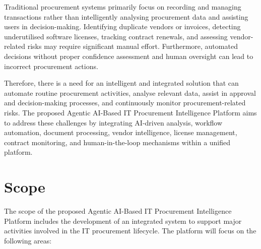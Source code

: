 Traditional procurement systems primarily focus on recording and managing transactions rather than intelligently analysing procurement data and assisting users in decision-making. Identifying duplicate vendors or invoices, detecting underutilised software licenses, tracking contract renewals, and assessing vendor-related risks may require significant manual effort. Furthermore, automated decisions without proper confidence assessment and human oversight can lead to incorrect procurement actions.

Therefore, there is a need for an intelligent and integrated solution that can automate routine procurement activities, analyse relevant data, assist in approval and decision-making processes, and continuously monitor procurement-related risks. The proposed Agentic AI-Based IT Procurement Intelligence Platform aims to address these challenges by integrating AI-driven analysis, workflow automation, document processing, vendor intelligence, license management, contract monitoring, and human-in-the-loop mechanisms within a unified platform.

\section{Scope}

The scope of the proposed Agentic AI-Based IT Procurement Intelligence Platform includes the development of an integrated system to support major activities involved in the IT procurement lifecycle. The platform will focus on the following areas:

